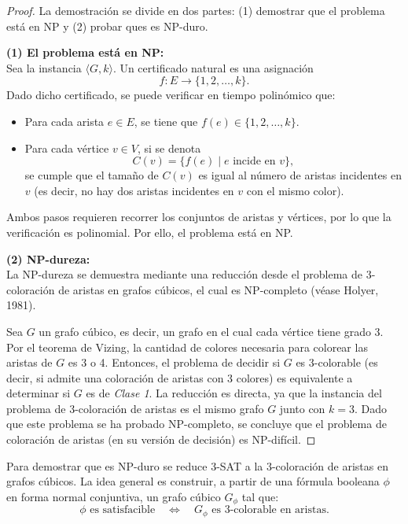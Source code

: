 \documentclass[a4paper]{article}
\begin{document}
\begin{proof}
La demostración se divide en dos partes: (1) demostrar que el problema está en NP y (2) probar ques es NP-duro.

\textbf{(1) El problema está en NP:}\\
Sea la instancia $\langle G,k \rangle$. Un certificado natural es una asignación 
\[
f : E \to \{1,2,\dots,k\}.
\]
Dado dicho certificado, se puede verificar en tiempo polinómico que:
\begin{itemize}
    \item Para cada arista $e\in E$, se tiene que $f(e)\in \{1,2,\dots,k\}$.
    \item Para cada vértice $v\in V$, si se denota
    \[
    C(v)=\{ f(e) \mid e \text{ incide en } v \},
    \]
    se cumple que el tamaño de $C(v)$ es igual al número de aristas incidentes en $v$ (es decir, no hay dos aristas incidentes en $v$ con el mismo color).
\end{itemize}
Ambos pasos requieren recorrer los conjuntos de aristas y vértices, por lo que la verificación es polinomial. Por ello, el problema está en NP.

\vspace{0.3cm}
\textbf{(2) NP-dureza:}\\
La NP-dureza se demuestra mediante una reducción desde el problema de 3-coloración de aristas en grafos cúbicos, el cual es NP-completo (véase Holyer, 1981).

Sea $G$ un grafo cúbico, es decir, un grafo en el cual cada vértice tiene grado 3. Por el teorema de Vizing, la cantidad de colores necesaria para colorear las aristas de $G$ es 3 o 4. Entonces, el problema de decidir si $G$ es 3-colorable (es decir, si admite una coloración de aristas con 3 colores) es equivalente a determinar si $G$ es de \emph{Clase 1}. La reducción es directa, ya que la instancia del problema de 3-coloración de aristas es el mismo grafo $G$ junto con $k=3$. Dado que este problema se ha probado NP-completo, se concluye que el problema de coloración de aristas (en su versión de decisión) es NP-difícil.

\end{proof}

Para demostrar que es NP-duro se reduce 3-SAT a la 3-coloración de aristas en grafos cúbicos. La idea general es construir, a partir de una fórmula booleana $\phi$ en forma normal conjuntiva, un grafo cúbico $G_\phi$ tal que:
\[
\phi \text{ es satisfacible} \quad\Longleftrightarrow\quad G_\phi \text{ es 3-colorable en aristas.}
\]
\end{document}

